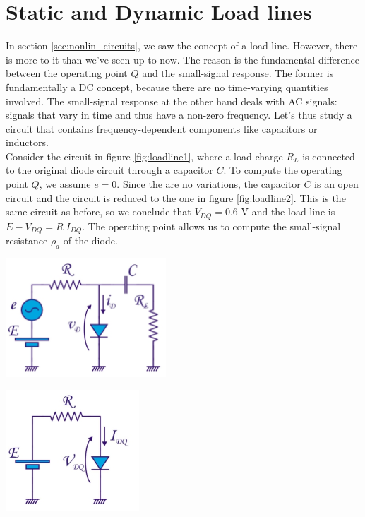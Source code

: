 \section{Static and Dynamic Load lines}
In section \ref{sec:nonlin_circuits}, we saw the concept of a load line. However, there is more to it than we've seen up to now. The reason is the fundamental difference between the operating point $Q$ and the small-signal response. The former is fundamentally a DC concept, because there are no time-varying quantities involved. The small-signal response at the other hand deals with AC signals: signals that vary in time and thus have a non-zero frequency. Let's thus study a circuit that contains frequency-dependent components like capacitors or inductors.\\
Consider the circuit in figure \ref{fig:loadline1}, where a load charge $R_L$ is connected to the original diode circuit through a capacitor $C$. To compute the operating point $Q$, we assume $e=0$. Since the are no variations, the capacitor $C$ is an open circuit and the circuit is reduced to the one in figure \ref{fig:loadline2}. This is the same circuit as before, so we conclude that $V_{DQ} = 0.6$ V and the load line is $E-V_{DQ} = R\; I_{DQ}$. The operating point allows us to compute the small-signal resistance $\rho_d$ of the diode.

\begin{minipage}{.5\textwidth}
	\centering
	\includegraphics[width=6cm]{figures/ch02/loadline1.jpg}
	\label{fig:loadline1}
\end{minipage}%
\begin{minipage}{.5\textwidth}
	\centering
	\includegraphics[width=5cm]{figures/ch02/loadline2.jpg}
	\label{fig:loadline2}
\end{minipage}

